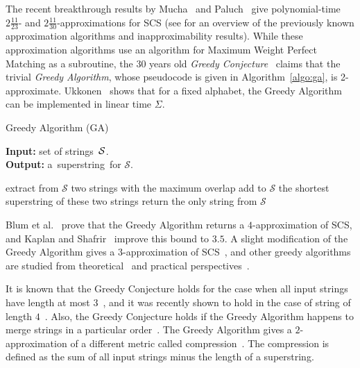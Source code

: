 \documentclass[11pt]{article}
\begin{document}
The recent breakthrough results by Mucha~\cite{M2013} and Paluch~\cite{P14} give polynomial-time $2\frac{11}{23}$- and $2\frac{11}{30}$-approximations for SCS (see \cite[Section~2.1]{GKM13} for an overview of the 
previously known approximation algorithms
and inapproximability results). While these approximation algorithms use an algorithm for Maximum Weight Perfect Matching as a subroutine, the $30$ years old \emph{Greedy Conjecture}~\cite{storer1987data, TU1988, T1989, BJLTY1991} claims that the trivial \emph{Greedy Algorithm}, whose pseudocode is given in Algorithm~\ref{algo:ga}, is 2-approximate. Ukkonen~\cite{ukkonen1990linear} shows that for a fixed alphabet, the Greedy Algorithm can be implemented in linear time $\Sigma$.

\begin{algorithm}[ht]
\label{algo:ga}
\caption{Greedy Algorithm (GA)}
\hspace*{\algorithmicindent} \textbf{Input:} set of strings~${\cal S}$.\\
\hspace*{\algorithmicindent} \textbf{Output:} a~superstring~for $\mathcal{S}$.
\begin{algorithmic}[1]
\State extract from $\mathcal{S}$ two strings with the maximum overlap
\State add to $\mathcal{S}$ the shortest superstring of these two strings
\EndWhile
\State return the only string from $\mathcal{S}$
\end{algorithmic}
\end{algorithm}


Blum et al.~\cite{BJLTY1991} prove that the Greedy Algorithm returns a $4$-approximation of SCS, and Kaplan and Shafrir~\cite{KS2005} improve this bound to $3.5$. A slight modification of the Greedy Algorithm gives a $3$-approximation of SCS~\cite{BJLTY1991}, and other greedy algorithms are studied from theoretical~\cite{BJLTY1991,rivals2018superstrings} and practical perspectives~\cite{romero2004experimental, cazaux2018practical}.

It is known that the Greedy Conjecture holds for the case when all input strings have length at most $3$~\cite{TU1988, cazaux20143}, and it was recently shown to hold in the case of string of length $4$~\cite{kulikov2015greedy}. Also, the Greedy Conjecture holds if the Greedy Algorithm happens to merge strings in a particular order~\cite{weinard2006greedy, laube2005conditional}. The Greedy Algorithm gives a $2$-approximation of a different metric called compression~\cite{TU1988}. The compression is defined as the sum of all input strings minus the length of a superstring.
\end{document}
